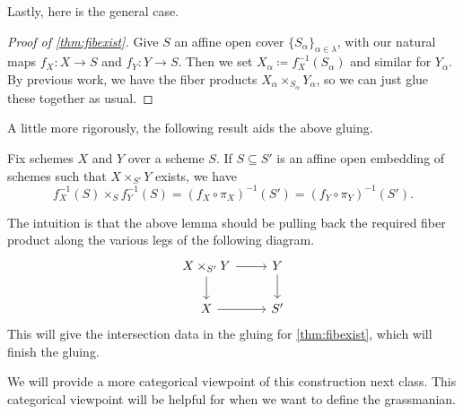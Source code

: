 \documentclass[../notes.tex]{subfiles}
\begin{document}
Lastly, here is the general case.
\begin{proof}[Proof of \autoref{thm:fibexist}]
	Give $S$ an affine open cover $\{S_\alpha\}_{\alpha\in\lambda}$, with our natural maps $f_X\colon X\to S$ and $f_Y\colon Y\to S$. Then we set $X_\alpha\coloneqq f_X^{-1}(S_\alpha)$ and similar for $Y_\alpha$. By previous work, we have the fiber products $X_\alpha\times_{S_\alpha}Y_\alpha$, so we can just glue these together as usual.
\end{proof}
A little more rigorously, the following result aids the above gluing.
\begin{lemma}
	Fix schemes $X$ and $Y$ over a scheme $S$. If $S\subseteq S'$ is an affine open embedding of schemes such that $X\times_{S'}Y$ exists, we have
	\[f_X^{-1}(S)\times_Sf_Y^{-1}(S)=(f_X\circ\pi_X)^{-1}(S')=(f_Y\circ\pi_Y)^{-1}(S').\]
\end{lemma}
The intuition is that the above lemma should be pulling back the required fiber product along the various legs of the following diagram.
\[\begin{tikzcd}
	{X\times_{S'}Y} & Y \\
	X & {S'}
	\arrow[from=1-1, to=1-2]
	\arrow[from=1-2, to=2-2]
	\arrow[from=1-1, to=2-1]
	\arrow[from=2-1, to=2-2]
\end{tikzcd}\]
This will give the intersection data in the gluing for \autoref{thm:fibexist}, which will finish the gluing.
\begin{remark}
	We will provide a more categorical viewpoint of this construction next class. This categorical viewpoint will be helpful for when we want to define the grassmanian.
\end{remark}
\end{document}
